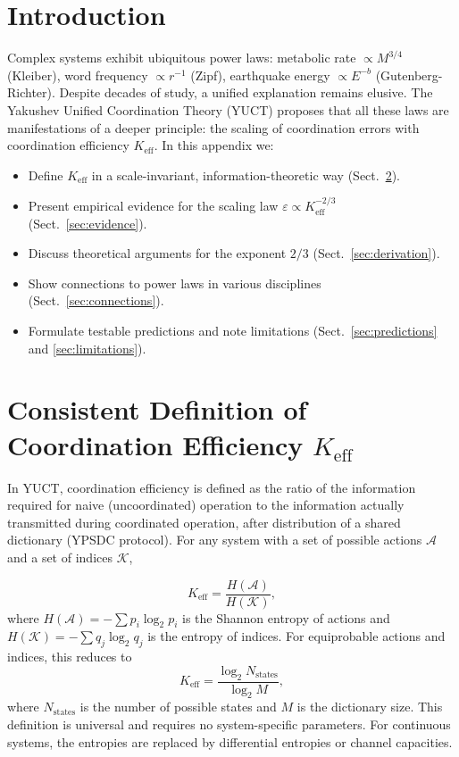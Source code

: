 \documentclass[12pt]{article}
\newcommand{\Keff}{K_{\mathrm{eff}}}
\newcommand{\eps}{\varepsilon}
\begin{document}
	\tableofcontents
	\newpage
	
	\section{Introduction}
	Complex systems exhibit ubiquitous power laws: metabolic rate \(\propto M^{3/4}\) (Kleiber), word frequency \(\propto r^{-1}\) (Zipf), earthquake energy \(\propto E^{-b}\) (Gutenberg-Richter). Despite decades of study, a unified explanation remains elusive. The Yakushev Unified Coordination Theory (YUCT) proposes that all these laws are manifestations of a deeper principle: the scaling of coordination errors with coordination efficiency \(\Keff\). In this appendix we:
	\begin{itemize}
		\item Define \(\Keff\) in a scale-invariant, information-theoretic way (Sect.~\ref{sec:keff}).
		\item Present empirical evidence for the scaling law \(\eps \propto \Keff^{-2/3}\) (Sect.~\ref{sec:evidence}).
		\item Discuss theoretical arguments for the exponent \(2/3\) (Sect.~\ref{sec:derivation}).
		\item Show connections to power laws in various disciplines (Sect.~\ref{sec:connections}).
		\item Formulate testable predictions and note limitations (Sect.~\ref{sec:predictions} and \ref{sec:limitations}).
	\end{itemize}
	
	\section{Consistent Definition of Coordination Efficiency \(\Keff\)}
	\label{sec:keff}
	
	In YUCT, coordination efficiency is defined as the ratio of the information required for naive (uncoordinated) operation to the information actually transmitted during coordinated operation, after distribution of a shared dictionary (YPSDC protocol). For any system with a set of possible actions \(\mathcal{A}\) and a set of indices \(\mathcal{K}\),
	
	\begin{equation}
		\Keff = \frac{H(\mathcal{A})}{H(\mathcal{K})},
		\label{eq:keff}
	\end{equation}
	where \(H(\mathcal{A}) = -\sum p_i \log_2 p_i\) is the Shannon entropy of actions and \(H(\mathcal{K}) = -\sum q_j \log_2 q_j\) is the entropy of indices. For equiprobable actions and indices, this reduces to
	\begin{equation}
		\Keff = \frac{\log_2 N_{\text{states}}}{\log_2 M},
		\label{eq:keff-simple}
	\end{equation}
	where \(N_{\text{states}}\) is the number of possible states and \(M\) is the dictionary size. This definition is universal and requires no system-specific parameters. For continuous systems, the entropies are replaced by differential entropies or channel capacities.
	
\end{document}

